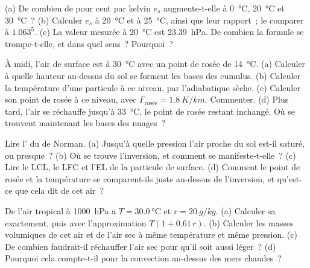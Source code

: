 \begin{exercise}[$\star$]\label{exo:b2:atmospheric-thermodynamics:2}
(a) De combien de pour cent par kelvin $e_s$ augmente-t-elle à \qty{0}{\celsius}, \qty{20}{\celsius}
et \qty{30}{\celsius}~? (b) Calculer $e_s$ à \qty{20}{\celsius} et à \qty{25}{\celsius},
ainsi que leur rapport~; le comparer à $1.063^5$. (c) La valeur mesurée à \qty{20}{\celsius}
est \qty{23.39}{hPa}. De combien la formule se trompe-t-elle, et dans quel sens~? Pourquoi~?
\end{exercise}

\begin{exercise}[$\star$]\label{exo:b2:atmospheric-thermodynamics:3}
À midi, l'air de surface est à \qty{30}{\celsius} avec un point de rosée de \qty{14}{\celsius}. (a) Calculer à
quelle hauteur au-dessus du sol se forment les bases des cumulus. (b) Calculer la température d'une particule à
ce niveau, par l'adiabatique sèche. (c) Calculer son point de rosée à ce niveau, avec $\Gamma_{\text{rosée}} =
\qty{1.8}{K/km}$. Commenter. (d) Plus tard, l'air se réchauffe jusqu'à \qty{33}{\celsius},
le point de rosée restant inchangé. Où se trouvent maintenant les bases des nuages~?
\end{exercise}

\begin{exercise}[$\star$]\label{exo:b2:atmospheric-thermodynamics:4}
Lire l' du  de Norman. (a) Jusqu'à quelle pression l'air proche du
sol est-il saturé, ou presque~? (b) Où se trouve l'inversion, et comment se manifeste-t-elle~? (c)
Lire le LCL, le LFC et l'EL de la particule de surface. (d) Comment le point de rosée et la
température se comparent-ils juste au-dessus de l'inversion, et qu'est-ce que cela dit de cet air~?
\end{exercise}

\begin{exercise}[$\star\star$]\label{exo:b2:atmospheric-thermodynamics:5}
De l'air tropical à \qty{1000}{hPa} a $T = \qty{30.0}{\celsius}$ et $r = \qty{20}{g/kg}$. (a) Calculer sa
 exactement, puis avec l'approximation $T(1 + 0.61\,r)$. (b) Calculer les masses volumiques
de cet air et de l'air sec à même température et même pression. (c) De combien faudrait-il réchauffer l'air sec
pour qu'il soit aussi léger~? (d) Pourquoi cela compte-t-il pour la convection au-dessus des mers chaudes~?
\end{exercise}


